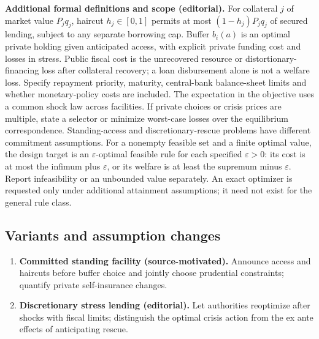 \documentclass[11pt,a4paper]{article}
\begin{document}
\textbf{Additional formal definitions and scope (editorial).} For collateral \(j\) of market value \(P_j q_j\), haircut \(h_j\in[0,1]\) permits at most \((1-h_j)P_j q_j\) of secured lending, subject to any separate borrowing cap. Buffer \(b_i(a)\) is an optimal private holding given anticipated access, with explicit private funding cost and losses in stress. Public fiscal cost is the unrecovered resource or distortionary-financing loss after collateral recovery; a loan disbursement alone is not a welfare loss. Specify repayment priority, maturity, central-bank balance-sheet limits and whether monetary-policy costs are included. The expectation in the objective uses a common shock law across facilities. If private choices or crisis prices are multiple, state a selector or minimize worst-case losses over the equilibrium correspondence. Standing-access and discretionary-rescue problems have different commitment assumptions. For a nonempty feasible set and a finite optimal value, the design target is an \(\varepsilon\)-optimal feasible rule for each specified \(\varepsilon>0\): its cost is at most the infimum plus \(\varepsilon\), or its welfare is at least the supremum minus \(\varepsilon\). Report infeasibility or an unbounded value separately. An exact optimizer is requested only under additional attainment assumptions; it need not exist for the general rule class.
\subsection*{Variants and assumption changes}
\begin{enumerate}
\item \textbf{Committed standing facility (source-motivated).} Announce access and haircuts before buffer choice and jointly choose prudential constraints; quantify private self-insurance changes.
\item \textbf{Discretionary stress lending (editorial).} Let authorities reoptimize after shocks with fiscal limits; distinguish the optimal crisis action from the ex ante effects of anticipating rescue.
\end{enumerate}
\end{document}
